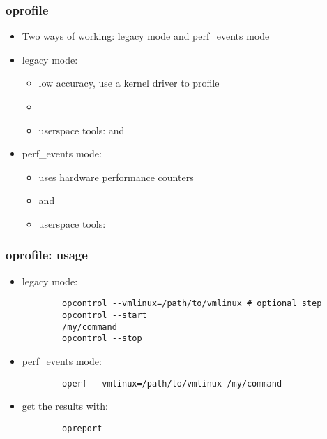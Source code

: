 \begin{frame}
\frametitle{oprofile}
\begin{itemize}
	\item Two ways of working: legacy mode and perf\_events mode
	\item legacy mode:
	\begin{itemize}
		\item low accuracy, use a kernel driver to profile
		\item {}
		\item userspace tools:  and 
	\end{itemize}
	\item perf\_events mode:
	\begin{itemize}
		\item uses hardware performance counters
		\item {} and 
		\item userspace tools: 
	\end{itemize}
\end{itemize}
\end{frame}

\begin{frame}[fragile]
\frametitle{oprofile: usage}
\begin{itemize}
	\item legacy mode:
	\begin{block}{}
	\begin{verbatim}
		opcontrol --vmlinux=/path/to/vmlinux # optional step
		opcontrol --start
		/my/command
		opcontrol --stop
	\end{verbatim}
	\end{block}
	\item perf\_events mode:
	\begin{block}{}
	\begin{verbatim}
		operf --vmlinux=/path/to/vmlinux /my/command
	\end{verbatim}
	\end{block}
	\item get the results with:
	\begin{block}{}
	\begin{verbatim}
		opreport
	\end{verbatim}
	\end{block}
\end{itemize}
\end{frame}

